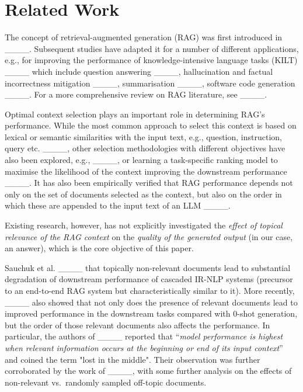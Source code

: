\section{Related Work}
The concept of retrieval-augmented generation (RAG) was first introduced in ____. Subsequent studies have adapted it for a number of different applications, e.g., for improving the performance of knowledge-intensive language tasks (KILT) ____ which include question answering ____, hallucination and factual incorrectness mitigation ____, summarisation ____, software code generation ____. For a more comprehensive review on RAG literature, see ____.

Optimal context selection plays an important role in determining RAG's performance. While the most common approach to select this context is based on lexical or semantic similarities with the input text, e.g., question, instruction, query etc. ____, other selection methodologies with different objectives have also been explored, e.g., ____,
or learning a task-specific ranking model to maximise the likelihood of the  
context improving the downstream performance ____.
It has also been empirically verified that RAG performance depends not only on the set of documents selected as the context, but also on the order in which these are appended to the input text of an LLM ____.

Existing research, however, has not explicitly investigated the \textit{effect of topical relevance of the RAG context} on the \textit{quality of the generated output} (in our case, an answer), which is the core objective of this paper.


Sauchuk et al. ____  that topically non-relevant documents lead to substantial degradation of downstream performance of cascaded IR-NLP systems (precursor to an end-to-end RAG system but characteristically similar to it). {More recently,} ____ also showed that not only does the presence of relevant documents lead to improved performance in the downstream tasks compared with 0-shot generation, but the order of those relevant documents also affects the performance.
In particular, the authors of ____ reported that
``\textit{model performance is highest when relevant information occurs at the beginning or end of its input context}'' and coined the term "lost in the middle". Their observation was further corroborated by the work of ____, with some further analysis on the effects of non-relevant vs.\ randomly sampled off-topic documents.

